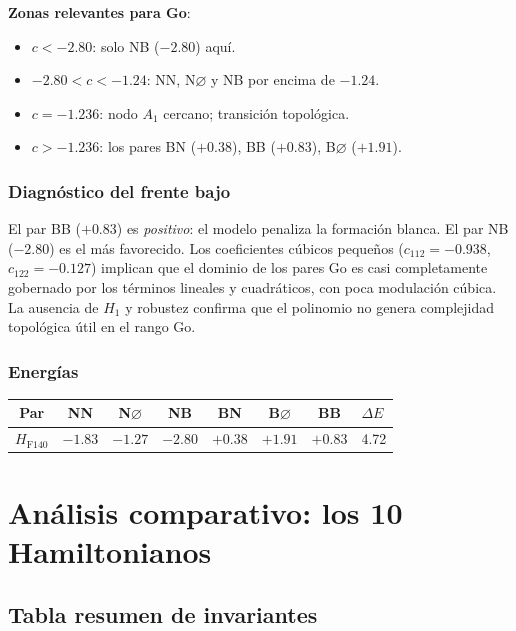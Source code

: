 \documentclass[11pt,a4paper]{article}
\newcommand{\dE}{\Delta E}
\begin{document}
\textbf{Zonas relevantes para Go}:
\begin{itemize}[noitemsep]
  \item $c < -2.80$: solo NB ($-2.80$) aquí.
  \item $-2.80 < c < -1.24$: NN, N$\varnothing$ y NB por encima de $-1.24$.
  \item $c = -1.236$: nodo $A_1$ cercano; transición topológica.
  \item $c > -1.236$: los pares BN ($+0.38$), BB ($+0.83$), B$\varnothing$ ($+1.91$).
\end{itemize}

\subsubsection*{Diagnóstico del frente bajo}

El par BB ($+0.83$) es \emph{positivo}: el modelo penaliza la formación
blanca. El par NB ($-2.80$) es el más favorecido.
Los coeficientes cúbicos pequeños ($c_{112}=-0.938$, $c_{122}=-0.127$)
implican que el dominio de los pares Go es casi completamente gobernado
por los términos lineales y cuadráticos, con poca modulación cúbica.
La ausencia de $H_1$ y robustez confirma que el polinomio no genera
complejidad topológica útil en el rango Go.

\subsubsection*{Energías}

\begin{center}
\begin{tabular}{ccccccc}
  \toprule
  Par & NN & N$\varnothing$ & NB & BN & B$\varnothing$ & BB & $\dE$ \\
  \midrule
  $H_{\text{F140}}$ & $-1.83$ & $-1.27$ & $-2.80$ & $+0.38$ & $+1.91$ & $+0.83$ & 4.72 \\
  \bottomrule
\end{tabular}
\end{center}

\newpage
\section{Análisis comparativo: los 10 Hamiltonianos}

\subsection{Tabla resumen de invariantes}
\end{document}

